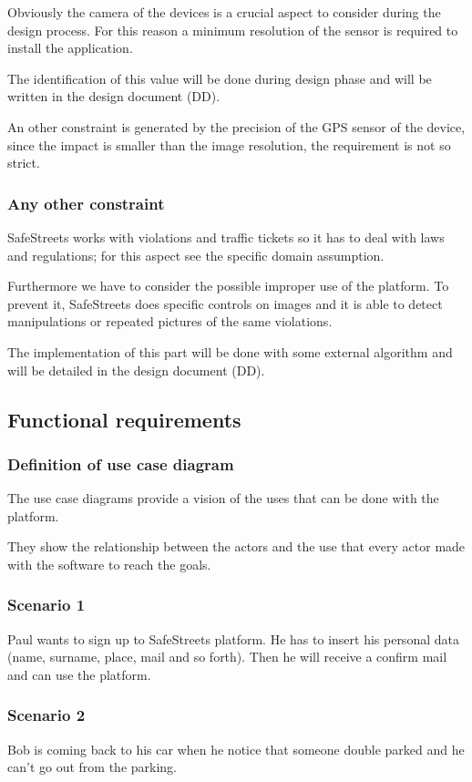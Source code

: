 Obviously the camera of the devices is a crucial aspect to consider during the design process. For this reason a minimum resolution of the sensor is required to install the application.

The identification of this value will be done during design phase and will be written in the design document (DD).

An other constraint is generated by the precision of the GPS sensor of the device, since the impact is smaller than the image resolution, the requirement is not so strict. 

\subsubsection{Any other constraint}
SafeStreets works with violations and traffic tickets so it has to deal with laws and regulations; for this aspect see the specific domain assumption.

Furthermore we have to consider the possible improper use of the platform. To prevent it, SafeStreets does specific controls on images and it is able to detect manipulations or repeated pictures of the same violations. 

The implementation of this part will be done with some external algorithm and will be detailed in the design document (DD).

\subsection{Functional requirements}
\subsubsection{Definition of use case diagram}
The use case diagrams provide a vision of the uses that can be done with the platform. 

They show the relationship between the actors and the use that every actor made with the software to reach the goals.

\subsubsection{Scenario 1}
Paul wants to sign up to SafeStreets platform. He has to insert his personal data (name, surname, place, mail and so forth). Then he will receive a confirm mail and can use the platform.

\subsubsection{Scenario 2}
Bob is coming back to his car when he notice that someone double parked and he can’t go out from the parking. 

